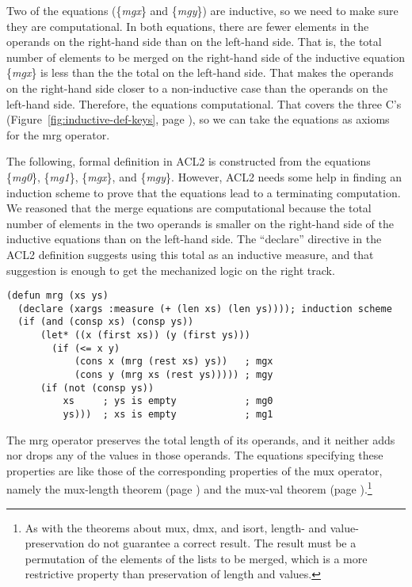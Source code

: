 Two of the equations (\{\emph{mgx}\} and \{\emph{mgy}\}) are inductive,
so we need to make sure they are computational.
In both equations, there are fewer elements in the operands
on the right-hand side than on the left-hand side.
That is, the total number of elements to be merged
on the right-hand side of the inductive equation \{\emph{mgx}\}
is less than the the total on the left-hand side.
That makes the operands on the right-hand side closer to
a non-inductive case than the operands on the left-hand side.
Therefore, the equations computational.
That covers the three C's
(Figure~\ref{fig:inductive-def-keys}, page \pageref{fig:inductive-def-keys}),
so we can take the equations as axioms for the mrg operator.

The following, formal definition in ACL2 is constructed from
the equations \{\emph{mg0}\}, \{\emph{mg1}\}, \{\emph{mgx}\}, and \{\emph{mgy}\}.
However, ACL2 needs some help in finding an induction scheme
to prove that the equations lead to a terminating computation.
We reasoned that the merge equations are computational
because the total number of elements in the two operands
is smaller on the right-hand side of the inductive equations
than on the left-hand side.
The ``declare'' directive in the ACL2 definition suggests using
this total as an inductive measure,
and that suggestion is enough to get the mechanized logic on the right track.

\label{defun:mrg}
\begin{Verbatim}
(defun mrg (xs ys)
  (declare (xargs :measure (+ (len xs) (len ys)))); induction scheme
  (if (and (consp xs) (consp ys))
      (let* ((x (first xs)) (y (first ys)))
        (if (<= x y)
            (cons x (mrg (rest xs) ys))   ; mgx
            (cons y (mrg xs (rest ys))))) ; mgy
      (if (not (consp ys))
          xs     ; ys is empty            ; mg0
          ys)))  ; xs is empty            ; mg1
\end{Verbatim}

The mrg operator preserves the total length of its operands,
and it neither adds nor drops any of the values in those operands.
The equations specifying these properties are like those of the
corresponding properties of the mux operator, namely
the mux-length theorem (page \pageref{mux-length-thm}) and the
mux-val theorem (page \pageref{thm:mux-val}).\footnote{As
with the theorems about
mux, dmx, and isort, length- and value-preservation
do not guarantee a correct result.
The result must be a permutation
of the elements of the lists to be merged,
which is a more restrictive property than
preservation of length and values.}

